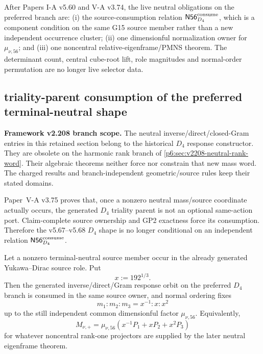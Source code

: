 \documentclass[12pt,a4paper]{article}
\begin{document}
\begin{remark}
\label{p6:rem:v568-contracted-neutral-frontier}
After Papers I-A v5.60 and V-A v3.74, the live neutral obligations on the
preferred branch are:
(i) the source-consumption relation
\(\mathsf{N56}_{D_4}^{\rm consume}\), which is a component condition on the
same G15 source member rather than a new independent occurrence cluster;
(ii) one dimensionful normalization owner for \(\mu_{\nu,56}\); and
(iii) one noncentral relative-eigenframe/PMNS theorem.  The determinant count,
central cube-root lift, role magnitudes and normal-order permutation are no
longer live selector data.
\end{remark}


\subsection{triality-parent consumption of the preferred terminal-neutral shape}
\label{p6:sec:v569-d4-triality-neutrino-consumption}

\noindent\textbf{Framework v2.208 branch scope.}
The neutral inverse/direct/closed-Gram entries in this retained section
belong to the historical $D_4$ response constructor. They are obsolete
on the harmonic rank branch of \ref{p6:sec:v2208-neutral-rank-word}.
Their algebraic theorems neither force nor constrain that new mass word.
The charged results and branch-independent geometric/source rules keep
their stated domains.


Paper~V-A v3.75 proves that, once a nonzero neutral mass/source coordinate
actually occurs, the generated \(D_4\) triality parent is not an optional
same-action port.  Claim-complete source ownership and GP2 exactness force its
consumption.  Therefore the v5.67--v5.68 \(D_4\) shape is no longer conditional
on an independent relation \(\mathsf{N56}_{D_4}^{\rm consume}\).

\begin{theorem}
\label{p6:thm:v569-preferred-neutral-shape-after-actuality}
Let a nonzero terminal-neutral source member occur in the already generated
Yukawa--Dirac source role.  Put
\[
 x:=192^{1/3}.
\]
Then the generated inverse/direct/Gram response orbit on the preferred
\(D_4\) branch is consumed in the same source owner, and normal ordering fixes
\[
 \boxed{m_1:m_2:m_3=x^{-1}:x:x^2}
\]
up to the still independent common dimensionful factor \(\mu_{\nu,56}\).
Equivalently,
\[
 M_{\nu,+}=\mu_{\nu,56}
 \left(x^{-1}P_1+xP_2+x^2P_3\right)
\]
for whatever noncentral rank-one projectors are supplied by the later neutral
eigenframe theorem.
\end{theorem}
\end{document}
